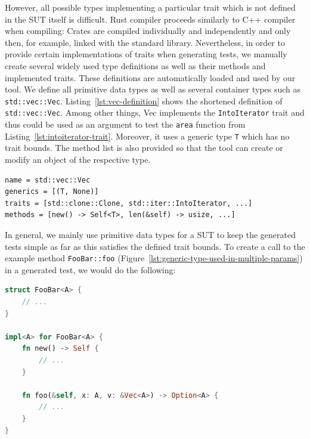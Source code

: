 \documentclass{article}
\begin{document}
However, all possible types implementing a particular trait which is not defined in the SUT itself is difficult. Rust compiler proceeds similarly to C++ compiler when compiling: Crates are compiled individually and independently and only then, for example, linked with the standard library. Nevertheless, in order to provide certain implementations of traits when generating tests, we manually create several widely used type definitions as well as their methods and implemented traits. These definitions are automatically loaded and used by our tool. We define all primitive data types as well as several container types such as \lstinline{std::vec::Vec}. Listing~\ref{lst:vec-definition} shows the shortened definition of \lstinline{std::vec::Vec}. Among other things, Vec implements the \lstinline{IntoIterator} trait and thus could be used as an argument to test the \lstinline{area} function from Listing~\ref{lst:intoiterator-trait}. Moreover, it uses a generic type \lstinline{T} which has no trait bounds. The method list is also provided so that the tool can create or modify an object of the respective type.

\begin{lstlisting}[language={}, style=boxed, caption={std::vec::Vec type definition}, label=lst:vec-definition]
name = std::vec::Vec
generics = [(T, None)]
traits = [std::clone::Clone, std::iter::IntoIterator, ...]
methods = [new() -> Self<T>, len(&self) -> usize, ...]
\end{lstlisting}

In general, we mainly use primitive data types for a \ac{SUT} to keep the generated tests simple as far as this satisfies the defined trait bounds. To create a call to the example method \lstinline{FooBar::foo} (Figure~\ref{lst:generic-type-used-in-multiple-params}) in a generated test, we would do the following:

\begin{lstlisting}[language=Rust, style=boxed, caption={A generic type A is used in multiple parameters and return value}, label=lst:generic-type-used-in-multiple-params]
struct FooBar<A> {
    // ...
}

impl<A> for FooBar<A> {
    fn new() -> Self {
        // ...
    }

    fn foo(&self, x: A, v: &Vec<A>) -> Option<A> {
        // ...
    }
}
\end{lstlisting}
\end{document}
